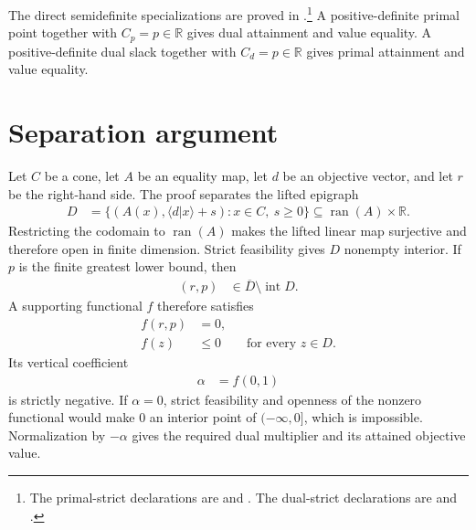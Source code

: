 \documentclass{article}
\begin{document}
The direct semidefinite specializations are proved in
.\footnote{The primal-strict
declarations are
and
.
The dual-strict declarations are
and
.}
A positive-definite primal point together with $C_p=p\in\mathbb R$ gives dual
attainment and value equality. A positive-definite dual slack together with
$C_d=p\in\mathbb R$ gives primal attainment and value equality.

\section{Separation argument}

Let $C$ be a cone, let $A$ be an equality map, let $d$ be an objective vector,
and let $r$ be the right-hand side. The proof separates the lifted epigraph
\begin{align}
  D
    &=\{(A(x),\langle d|x\rangle+s):x\in C,\ s\geq0\}
      \subseteq\operatorname{ran}(A)\times\mathbb R.
  \label{eq:wolf_slater_attainment_conditions_lifted_epigraph}
\end{align}
Restricting the codomain to $\operatorname{ran}(A)$ makes the lifted linear
map surjective and therefore open in finite dimension. Strict feasibility
gives $D$ nonempty interior. If $p$ is the finite greatest lower bound, then
\begin{align}
  (r,p)
    &\in\overline D\setminus\operatorname{int}D.
  \label{eq:wolf_slater_attainment_conditions_boundary_point}
\end{align}
A supporting functional $f$ therefore satisfies
\begin{align}
  f(r,p)
    &=0,
  \label{eq:wolf_slater_attainment_conditions_supporting_vanishes}\\
  f(z)
    &\leq0
    \qquad\text{for every }z\in D.
  \label{eq:wolf_slater_attainment_conditions_supporting_nonpositive}
\end{align}
Its vertical coefficient
\begin{align}
  \alpha
    &=f(0,1)
  \label{eq:wolf_slater_attainment_conditions_vertical_coefficient}
\end{align}
is strictly negative. If $\alpha=0$, strict feasibility and openness of the
nonzero functional would make $0$ an interior point of $(-\infty,0]$, which
is impossible. Normalization by $-\alpha$ gives the required dual multiplier
and its attained objective value.
\end{document}
